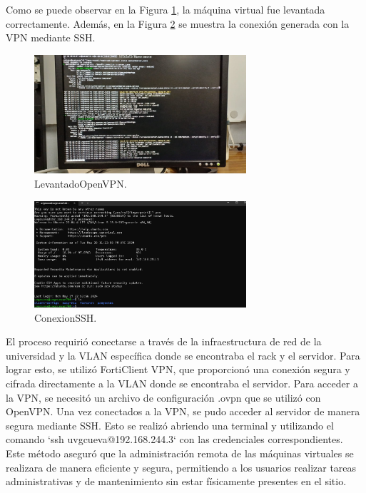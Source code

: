 Como se puede observar en la Figura \ref{fig:LevantadoOpenVPN}, la máquina virtual fue levantada correctamente. Además, en la Figura \ref{fig:ConexionSSH} se muestra la conexión generada con la VPN mediante SSH.

\begin{figure}[H]
    \centering
    \includegraphics[width=0.7\textwidth]{figuras/LevantadoOpenVPN.png}
    \caption{LevantadoOpenVPN.}
    \label{fig:LevantadoOpenVPN}
\end{figure}


\begin{figure}[H]
    \centering
    \includegraphics[width=0.7\textwidth]{figuras/ConexionSSH.png}
    \caption{ConexionSSH.}
    \label{fig:ConexionSSH}
\end{figure}

El proceso requirió conectarse a través de la infraestructura de red de la universidad y la VLAN específica donde se encontraba el rack y el servidor. Para lograr esto, se utilizó FortiClient VPN, que proporcionó una conexión segura y cifrada directamente a la VLAN donde se encontraba el servidor. Para acceder a la VPN, se necesitó un archivo de configuración .ovpn que se utilizó con OpenVPN. Una vez conectados a la VPN, se pudo acceder al servidor de manera segura mediante SSH. Esto se realizó abriendo una terminal y utilizando el comando `ssh uvgcueva@192.168.244.3` con las credenciales correspondientes. Este método aseguró que la administración remota de las máquinas virtuales se realizara de manera eficiente y segura, permitiendo a los usuarios realizar tareas administrativas y de mantenimiento sin estar físicamente presentes en el sitio.

